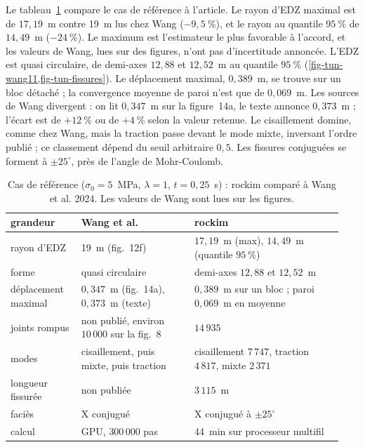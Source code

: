 Le tableau~\ref{tab-tun-ref} compare le cas de référence à l'article. Le rayon d'EDZ maximal est de $17{,}19$~m contre 19~m lus chez Wang ($-9{,}5~\%$), et le rayon au quantile $95~\%$ de $14{,}49$~m ($-24~\%$). Le maximum est l'estimateur le plus favorable à l'accord, et les valeurs de Wang, lues sur des figures, n'ont pas d'incertitude annoncée. L'EDZ est quasi circulaire, de demi-axes $12{,}88$ et $12{,}52$~m au quantile $95~\%$ (\cref{fig-tun-wang11,fig-tun-fissures}). Le déplacement maximal, $0{,}389$~m, se trouve sur un bloc détaché ; la convergence moyenne de paroi n'est que de $0{,}069$~m. Les sources de Wang divergent : on lit $0{,}347$~m sur la figure~14a, le texte annonce $0{,}373$~m ; l'écart est de $+12~\%$ ou de $+4~\%$ selon la valeur retenue. Le cisaillement domine, comme chez Wang, mais la traction passe devant le mode mixte, inversant l'ordre publié ; ce classement dépend du seuil arbitraire $0{,}5$. Les fissures conjuguées se forment à $\pm 25^\circ$, près de l'angle de Mohr-Coulomb.

\begin{table}[htbp]
\centering
\caption{Cas de référence ($\sigma_0 = 5$~MPa, $\lambda = 1$, $t = 0{,}25$~s) : rockim comparé à Wang et al. 2024. Les valeurs de Wang sont lues sur les figures.}
\label{tab-tun-ref}
\small
\begin{tabular}{@{}p{0.2\linewidth}p{0.32\linewidth}p{0.42\linewidth}@{}}
\toprule
grandeur & Wang et al. & rockim \\
\midrule
rayon d'EDZ & 19~m (fig.~12f) & $17{,}19$~m (max), $14{,}49$~m (quantile $95~\%$) \\
forme & quasi circulaire & demi-axes $12{,}88$ et $12{,}52$~m \\
déplacement maximal & $0{,}347$~m (fig.~14a), $0{,}373$~m (texte) & $0{,}389$~m sur un bloc ; paroi $0{,}069$~m en moyenne \\
joints rompus & non publié, environ $10\,000$ sur la fig.~8 & $14\,935$ \\
modes & cisaillement, puis mixte, puis traction & cisaillement $7\,747$, traction $4\,817$, mixte $2\,371$ \\
longueur fissurée & non publiée & $3\,115$~m \\
faciès & X conjugué & X conjugué à $\pm 25^\circ$ \\
calcul & GPU, $300\,000$ pas & 44~min sur processeur multifil \\
\bottomrule
\end{tabular}
\end{table}

